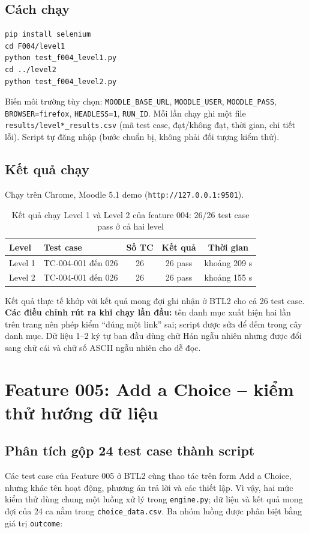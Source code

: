 \documentclass[12pt,a4paper]{article}
\begin{document}
\subsection{Cách chạy}
\begin{lstlisting}
pip install selenium
cd F004/level1
python test_f004_level1.py
cd ../level2
python test_f004_level2.py
\end{lstlisting}
Biến môi trường tùy chọn: \texttt{MOODLE\_BASE\_URL}, \texttt{MOODLE\_USER}, \texttt{MOODLE\_PASS}, \texttt{BROWSER=firefox}, \texttt{HEADLESS=1}, \texttt{RUN\_ID}. Mỗi lần chạy ghi một file \texttt{results/level*\_results.csv} (mã test case, đạt/không đạt, thời gian, chi tiết lỗi). Script tự đăng nhập (bước chuẩn bị, không phải đối tượng kiểm thử).

\subsection{Kết quả chạy}
Chạy trên Chrome, Moodle 5.1 demo (\texttt{http://127.0.0.1:9501}).
\begin{table}[H]
\centering\small
\begin{tabular}{|L{3.0cm}|L{4.2cm}|c|c|c|}
\hline
{}\textbf{Level} & \textbf{Test case} & \textbf{Số TC} & \textbf{Kết quả} & \textbf{Thời gian} \\ \hline
Level 1 & TC-004-001 đến 026 & 26 & 26 pass & khoảng 209 s \\ \hline
Level 2 & TC-004-001 đến 026 & 26 & 26 pass & khoảng 155 s \\ \hline
\end{tabular}
\caption{Kết quả chạy Level 1 và Level 2 của feature 004: 26/26 test case pass ở cả hai level}
\end{table}
Kết quả thực tế khớp với kết quả mong đợi ghi nhận ở BTL2 cho cả 26 test case. \textbf{Các điều chỉnh rút ra khi chạy lần đầu:} tên danh mục xuất hiện hai lần trên trang nên phép kiểm ``đúng một link'' sai; script được sửa để đếm trong cây danh mục. Dữ liệu 1--2 ký tự ban đầu dùng chữ Hán ngẫu nhiên nhưng được đổi sang chữ cái và chữ số ASCII ngẫu nhiên cho dễ đọc.
\section{Feature 005: Add a Choice -- kiểm thử hướng dữ liệu}

\subsection{Phân tích gộp 24 test case thành script}
Các test case của Feature 005 ở BTL2 cùng thao tác trên form Add a Choice, nhưng khác tên hoạt động,
phương án trả lời và các thiết lập. Vì vậy, hai mức kiểm thử dùng chung một luồng xử lý trong
\texttt{engine.py}; dữ liệu và kết quả mong đợi của 24 ca nằm trong \texttt{choice\_data.csv}.
Ba nhóm luồng được phân biệt bằng giá trị \texttt{outcome}:
\end{document}
